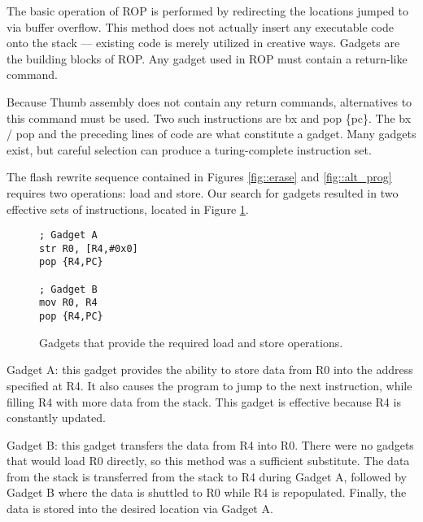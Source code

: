 The basic operation of ROP is performed by redirecting the locations jumped to via buffer overflow. This method does not actually insert any executable code onto the stack --- existing code is merely utilized in creative ways. Gadgets are the building blocks of ROP. Any gadget used in ROP must contain a return-like command. 

Because Thumb assembly does not contain any return commands, alternatives to this command must be used. Two such instructions are bx and pop \{pc\}. The bx / pop and the preceding lines of code are what constitute a gadget. Many gadgets exist, but careful selection can produce a turing-complete instruction set. 

The flash rewrite sequence contained in Figures \ref{fig::erase} and \ref{fig::alt_prog} requires two operations: load and store. Our search for gadgets resulted in two effective sets of instructions, located in Figure \ref{fig::gadget1}. 

	\begin{figure}[htbp]
		\begin{lstlisting}
; Gadget A
str R0, [R4,#0x0]
pop {R4,PC}

; Gadget B
mov R0, R4
pop {R4,PC}
		\end{lstlisting}
		\caption{Gadgets that provide the required load and store operations. }\label{fig::gadget1}
	\end{figure}
Gadget A: this gadget provides the ability to store data from R0 into the address specified at R4. It also causes the program to jump to the next instruction, while filling R4 with more data from the stack. This gadget is effective because R4 is constantly updated. 

Gadget B: this gadget transfers the data from R4 into R0. There were no gadgets that would load R0 directly, so this method was a sufficient substitute. The data from the stack is transferred from the stack to R4 during Gadget A, followed by Gadget B where the data is shuttled to R0 while R4 is repopulated. Finally, the data is stored into the desired location via Gadget A. 


